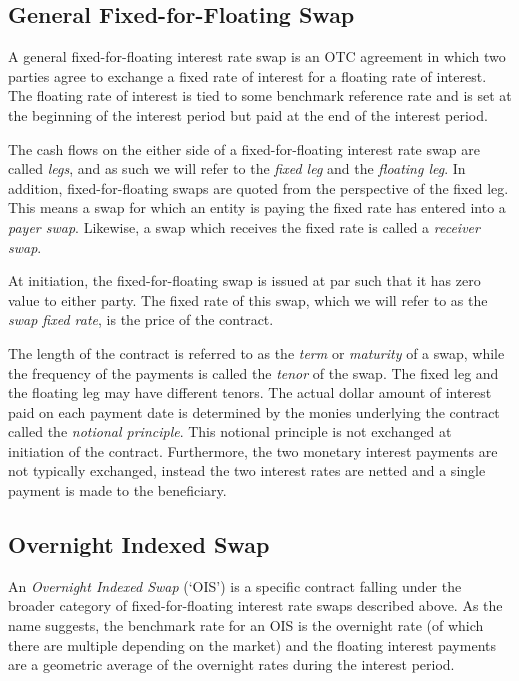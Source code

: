 \subsection{General Fixed-for-Floating Swap}
A general fixed-for-floating interest rate swap is an OTC agreement in which two parties agree to exchange a fixed rate of interest for a floating rate of interest. The floating rate of interest is tied to some benchmark reference rate and is set at the beginning of the interest period but paid at the end of the interest period. 

The cash flows on the either side of a fixed-for-floating interest rate swap are called \textit{legs}, and as such we will refer to the \textit{fixed leg} and the \textit{floating leg}. In addition, fixed-for-floating swaps are quoted from the perspective of the fixed leg. This means a swap for which an entity is paying the fixed rate has entered into a \textit{payer swap}. Likewise, a swap which receives the fixed rate is called a \textit{receiver swap}. 

At initiation, the fixed-for-floating swap is issued at par such that it has zero value to either party. The fixed rate of this swap, which we will refer to as the \textit{swap fixed rate}, is the price of the contract. 

The length of the contract is referred to as the \textit{term} or \textit{maturity} of a swap, while the frequency of the payments is called the \textit{tenor} of the swap. The fixed leg and the floating leg may have different tenors. The actual dollar amount of interest paid on each payment date is determined by the monies underlying the contract called the \textit{notional principle}. This notional principle is not exchanged at initiation of the contract. Furthermore, the two monetary interest payments are not typically exchanged, instead the two interest rates are netted and a single payment is made to the beneficiary.

\subsection{Overnight Indexed Swap}
An \textit{Overnight Indexed Swap} (`OIS') is a specific contract falling under the broader category of fixed-for-floating interest rate swaps described above. As the name suggests, the benchmark rate for an OIS is the overnight rate (of which there are multiple depending on the market) and the floating interest payments are a geometric average of the overnight rates during the interest period.

